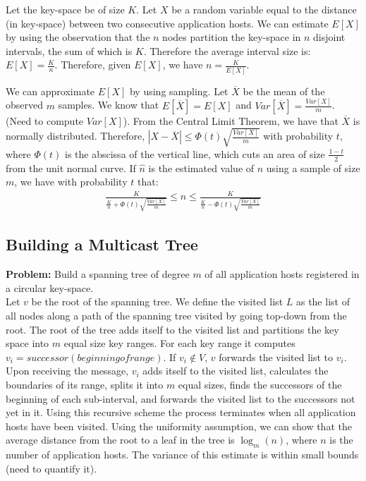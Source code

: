 \documentclass{article}
\begin{document}
 Let the key-space be of size $K$. Let $X$ be
a random variable equal to the distance (in key-space) between two
consecutive application hosts. We can estimate $E[X]$ by using the
observation that the $n$ nodes partition the key-space in $n$ disjoint
intervals, the sum of which is $K$. Therefore the average interval
size is: $E[X] = \frac{K}{n}$. Therefore, given $E[X]$, we have $n =
\frac{K}{E[X]}$.

We can approximate $E[X]$ by using sampling. Let $\overline{X}$ be the
mean of the observed $m$ samples. We know that $E[\overline{X}] = E[X]$
and $Var[\overline{X}] = \frac{Var[X]}{m}$. (Need to compute
$Var[X]$). From the Central Limit Theorem, we have that $\overline{X}$
is normally distributed. Therefore, $|X-\overline{X}| \leq
\Phi(t)\sqrt{\frac{Var[X]}{m}}$ with probability $t$, where $\Phi(t)$
is the abscissa of the vertical line, which cuts an area of size
$\frac{1-t}{2}$ from the unit normal curve. If $\widehat{n}$ is the
estimated value of $n$ using a sample of size $m$, we have with
probability $t$ that:
\begin{eqnarray*}
\frac{K}{\frac{K}{n} + \Phi(t)\sqrt{\frac{Var[X]}{m}}} \leq \widehat{n} \leq
  \frac{K}{\frac{K}{n} - \Phi(t)\sqrt{\frac{Var[X]}{m}} }
\end{eqnarray*}


\subsection{Building a Multicast Tree}
\label{sec:building}
{\bf Problem:} Build a spanning tree of degree $m$ of all application
hosts registered in a circular key-space.\\

 Let $v$ be the root of the spanning
tree. We define the visited list $L$ as the list of all nodes along a path
of the spanning tree visited by going top-down from the root. The root
of the tree adds itself to the visited list and partitions the key space
into $m$ equal size key 
ranges. For each key range it computes $v_i =
successor(beginning of range)$. If $v_i \notin V$, $v$ forwards the
visited list to $v_i$. Upon receiving the message, $v_i$ adds itself
to the visited list, calculates the boundaries of its range, splits it
into $m$ equal sizes, finds the successors of the beginning of
each sub-interval, and forwards the visited list to the successors not
yet in it. Using this recursive scheme the process terminates when all
application hosts have been visited. Using the uniformity assumption,
we can show that the average distance from the root to a leaf in the
tree is $\log_m(n)$, where $n$ is the number of application hosts. The
variance of this estimate is within small bounds (need to quantify it).
\end{document}
